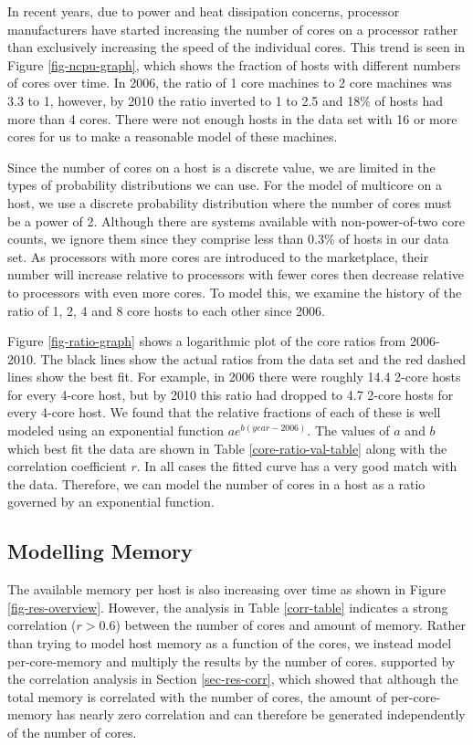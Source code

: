 \documentclass[conference]{IEEEtran}
\begin{document}
In recent years, due to power and heat dissipation concerns, processor manufacturers have started increasing the number of cores on a processor rather than exclusively increasing the speed of the individual cores.  This trend is seen in Figure \ref{fig-ncpu-graph}, which shows the fraction of hosts with different numbers of cores over time.  In 2006, the ratio of 1 core machines to 2 core machines was 3.3 to 1, however, by 2010 the ratio inverted to 1 to 2.5 and 18\% of hosts had more than 4 cores.  There were not enough hosts in the data set with 16 or more cores for us to make a reasonable model of these machines.

Since the number of cores on a host is a discrete value, we are limited in the types of probability distributions we can use.  For the model of multicore on a host, we use a discrete probability distribution where the number of cores must be a power of 2.  Although there are systems available with non-power-of-two core counts, we ignore them since they comprise less than 0.3\% of hosts in our data set.   As processors with more cores are introduced to the marketplace, their number will increase relative to processors with fewer cores then decrease relative to processors with even more cores.  To model this, we examine the history of the ratio of 1, 2, 4 and 8 core hosts to each other since 2006.

Figure \ref{fig-ratio-graph} shows a logarithmic plot of the core ratios from 2006-2010.  The black lines show the actual ratios from the data set and the red dashed lines show the best fit.  For example, in 2006 there were roughly 14.4 2-core hosts for every 4-core host, but by 2010 this ratio had dropped to 4.7 2-core hosts for every 4-core host.  We found that the relative fractions of each of these is well modeled using an exponential function $a e^{b (year-2006)}$.  The values of $a$ and $b$ which best fit the data are shown in Table \ref{core-ratio-val-table} along with the correlation coefficient $r$.  In all cases the fitted curve has a very good match with the data.  Therefore, we can model the number of cores in a host as a ratio governed by an exponential function.

\subsection{Modelling Memory}
\label{sec-model-mem}
The available memory per host is also increasing over time as shown in Figure \ref{fig-res-overview}.  However, the analysis in Table \ref{corr-table} indicates a strong correlation ($r > 0.6$) between the number of cores and amount of memory.  Rather than trying to model host memory as a function of the cores, we instead model per-core-memory and multiply the results by the number of cores.
 supported by the correlation analysis in Section \ref{sec-res-corr}, which showed that although the total memory is correlated with the number of cores, the amount of per-core-memory has nearly zero correlation and can therefore be generated independently of the number of cores.
\end{document}
